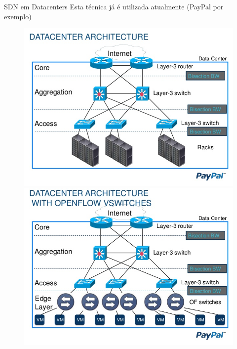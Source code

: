 \documentclass[aspectratio=169]{beamer}
\begin{document}
		\begin{frame} {SDN em Datacenters}
			Esta técnica já é utilizada atualmente (PayPal por exemplo)
			\begin{figure}[ht]   
				\includegraphics[scale=0.3]{imagens/sdn-1.jpg}
				\includegraphics[scale=0.3]{imagens/sdn-2.jpg}
				\label{fig:sample_figure}
			\end{figure}
		\end{frame}
\end{document}
